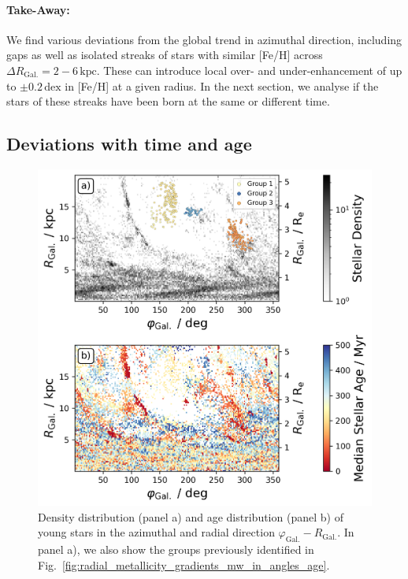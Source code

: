 \documentclass[fleqn,usenatbib]{mnras}
\begin{document}
\paragraph*{Take-Away:} We find various deviations from the global trend in azimuthal direction, including gaps as well as isolated streaks of stars with similar [Fe/H] across $\Delta R_\mathrm{Gal.} = 2-6\,\mathrm{kpc}$. These can introduce local over- and under-enhancement of up to $\pm 0.2\,\mathrm{dex}$ in [Fe/H] at a given radius. In the next section, we analyse if the stars of these streaks have been born at the same or different time.

\subsection{Deviations with time and age}
\label{sec:coherence_age_radial_metallicity_gradients}

\begin{figure}
    \centering
    \includegraphics[width=\columnwidth]{figures/phi_angle_R_follow_up.png}
    \caption{Density distribution (panel a) and age distribution (panel b) of young stars in the azimuthal and radial direction $\varphi_\mathrm{Gal.}-R_\mathrm{Gal.}$. In panel a), we also show the groups previously identified in Fig.~\ref{fig:radial_metallicity_gradients_mw_in_angles_age}.}
    \label{fig:phi_angle_R_follow_up}
\end{figure}
\end{document}
